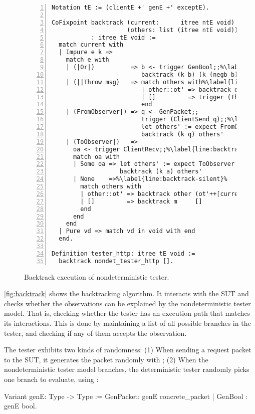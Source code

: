 \begin{figure}
\begin{lstlisting}[style=customcoq,numbers=left,escapechar=\%]
Notation tE := (clientE +' genE +' exceptE).

CoFixpoint backtrack (current:      itree ntE void)
                     (others: list (itree ntE void))
           : itree tE void :=
  match current with
  | Impure e k =>
    match e with
    | (|Or|)          => b <- trigger GenBool;;%\label{line:backtrack-or}%
                         backtrack (k b) (k (negb b)::others)
    | (||Throw msg)   => match others with%\label{line:backtrack-throw}%
                         | other::ot' => backtrack other ot'
                         | []         => trigger (Throw msg)
                         end
    | (FromObserver|) => q <- GenPacket;;
                         trigger (ClientSend q);;%\label{line:backtrack-send}%
                         let others' := expect FromObserver q others in
                         backtrack (k q) others'
    | (ToObserver|)   =>
      oa <- trigger ClientRecv;;%\label{line:backtrack-recv}%
      match oa with
      | Some oa => let others' := expect ToObserver a others in
                   backtrack (k a) others'
      | None    =>%\label{line:backtrack-silent}%
        match others with
        | other::ot' => backtrack other (ot'++[current]) (* postpone *)%\label{line:backtrack-postpone}%
        | []         => backtrack m     []               (* retry    *)
        end
      end
    end
  | Pure vd => match vd in void with end
  end.

Definition tester_http: itree tE void :=
  backtrack nondet_tester_http [].
\end{lstlisting}
\caption{Backtrack execution of nondeterministic tester.}
\label{fig:backtrack}
\end{figure}

\autoref{fig:backtrack} shows the backtracking algorithm.  It interacts with the
SUT and checks whether the observations can be explained by the nondeterministic
tester model.  That is, checking whether the tester has an execution path that
matches its interactions.  This is done by maintaining a list of all possible
branches in the tester, and checking if any of them accepts the observation.

The tester exhibits two kinds of randomness: (1) When sending a request packet
to the SUT, it generates the packet randomly with ; (2) When the
nondeterministic tester model branches, the deterministic tester randomly picks
one branch to evaluate, using :
\begin{coq}
  Variant genE: Type -> Type :=
    GenPacket: genE concrete_packet
  | GenBool  : genE bool.
\end{coq}

